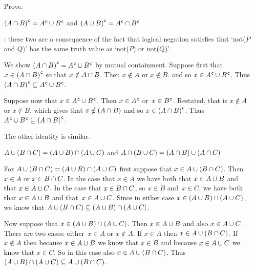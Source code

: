 \documentclass{test}  %
\begin{document}
\begin{problem}
  Prove.
\begin{exes}
\begin{exercise} 
  ${(A\cap B)}^{\mspace{1mu}\mathsf{c}}={A}^{\mspace{1mu}\mathsf{c}}\cup{B}^{\mspace{1mu}\mathsf{c}}$
  and
  ${(A\cup B)}^{\mspace{1mu}\mathsf{c}}={A}^{\mspace{1mu}\mathsf{c}}\cap{B}^{\mspace{1mu}\mathsf{c}}$ 
\end{exercise}
\begin{answer}
  \remark: these two are a consequence of the fact that logical negation
  satisfies that `not($P$ and $Q$)' has the same truth value as
  `not($P$) or not($Q$)'.

  We show  ${(A\cap B)}^{\mspace{1mu}\mathsf{c}}={A}^{\mspace{1mu}\mathsf{c}}\cup{B}^{\mspace{1mu}\mathsf{c}}$
  by mutual containment.
  Suppose first that $x\in {(A\cap B)}^{\mspace{1mu}\mathsf{c}}$ so that
  $x\notin A\cap B$.
  Then $x\notin A$ or $x\notin B$.
  and so $x\in {A}^{\mspace{1mu}\mathsf{c}}\cup{B}^{\mspace{1mu}\mathsf{c}}$.
  Thus ${(A\cap B)}^{\mspace{1mu}\mathsf{c}}\subseteq{A}^{\mspace{1mu}\mathsf{c}}\cup{B}^{\mspace{1mu}\mathsf{c}}$.

  Suppose now that $x\in {A}^{\mspace{1mu}\mathsf{c}}\cup{B}^{\mspace{1mu}\mathsf{c}}$.
  Then $x\in{A}^{\mspace{1mu}\mathsf{c}}$ or~$x\in{B}^{\mspace{1mu}\mathsf{c}}$.
  Restated, that is $x\notin A$ or $x\notin B$,
  which gives that $x\notin (A\cap B)$ and
  so $x\in{(A\cap B)}^{\mspace{1mu}\mathsf{c}}$.
  Thus ${A}^{\mspace{1mu}\mathsf{c}}\cup{B}^{\mspace{1mu}\mathsf{c}}\subseteq{(A\cap B)}^{\mspace{1mu}\mathsf{c}}$.
  
  The other identity is similar.  
\end{answer}
\begin{exercise}  
  $A\cup (B\cap C)=(A\cup B)\cap (A\cup C)$
  and 
  $A\cap (B\cup C)=(A\cap B)\cup (A\cap C)$
\end{exercise}
\begin{answer}
  For $A\cup (B\cap C)=(A\cup B)\cap (A\cup C)$
  first suppose that $x\in A\cup (B\cap C)$.
  Then $x\in A$ or $x\in B\cap C$.
  In the case that $x\in A$ we have both that $x\in A\cup B$ and that
  $x\in A\cup C$.
  In the case that $x\in B\cap C$, so $x\in B$ and~$x\in C$, 
  we have both that $x\in A\cup B$ and that~$x\in A\cup C$.
  Since in either case $x\in (A\cup B)\cap (A\cup C)$,
  we know that 
  $A\cup (B\cap C)\subseteq (A\cup B)\cap (A\cup C)$.

  Now suppose that $x\in (A\cup B)\cap (A\cup C)$.
  Then $x\in A\cup B$ and also $x\in A\cup C$.
  There are two cases: either~$x\in A$ or $x\notin A$.
  If $x\in A$ then $x\in A\cup (B\cap C)$.
  If $x\notin A$ then because $x\in A\cup B$ we know that $x\in B$
  and because $x\in A\cup C$ we know that $x\in C$.
  So in this case also $x\in A\cup (B\cap C)$.
  Thus 
  $(A\cup B)\cap (A\cup C)\subseteq A\cup (B\cap C)$.


\end{answer}
\end{exes}
\end{problem}
\end{document}
